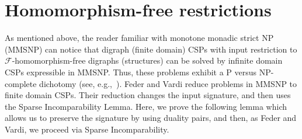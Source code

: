 \documentclass{article}
\theoremstyle{definition}
\theoremstyle{remark}
\newcommand{\calF}{{\mathcal F}}
\begin{document}
\section{Homomorphism-free restrictions}
\label{sect:FO-restrictions}

As mentioned above, the reader familiar with monotone monadic strict NP (MMSNP) can notice
that digraph (finite domain) CSPs with input restriction to $\calF$-homomorphism-free
digraphs (structures) can be solved by infinite domain CSPs expressible in MMSNP.
Thus, these problems exhibit a P versus NP-complete dichotomy (see,
e.g.,~\cite{MMSNP-Journal,FederVardi}). Feder and Vardi reduce problems in MMSNP to
finite domain CSPs. Their reduction changes the input signature, and then uses the Sparse 
Incomparability Lemma. Here, we prove the following lemma which allows us
to preserve the signature by using duality pairs, and then, as Feder and Vardi, we proceed
via Sparse Incomparability.
\end{document}
